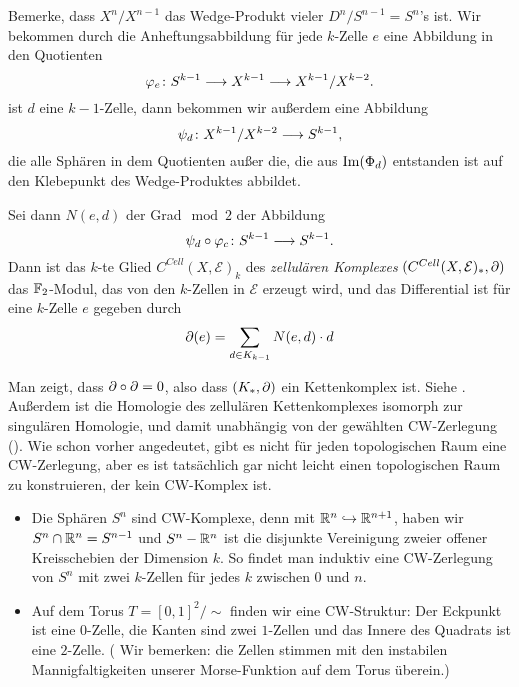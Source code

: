 \begin{definition}
    \label{def: zellulaerer kettenkomplex}
    Bemerke, dass $X^n / X^{n - 1}$ das Wedge-Produkt vieler $D^n / S^{n-1} = S^n$'s ist. 
    Wir bekommen durch die Anheftungsabbildung für jede $k$-Zelle $e$ eine Abbildung in den 
    Quotienten
    \[ \varphi_e \colon S^{k-1} \longrightarrow X^{k - 1} \longrightarrow X^{k - 1} / X^{k - 2} . \]
    ist $d$ eine $k - 1$-Zelle, dann bekommen wir außerdem eine Abbildung 
    \[ \psi_d \colon X^{k - 1} / X^{k - 2} \longrightarrow S^{k - 1} , \]
    die alle Sphären in dem Quotienten außer die, die aus ${ \operatorname{Im} } (\Phi_d)$ entstanden ist
    auf den Klebepunkt des Wedge-Produktes abbildet.

    Sei dann $N(e, d)$ der Grad$\mod 2$ der Abbildung
    \[ \psi_d \circ \varphi_c \colon S^{k - 1} \longrightarrow S^{k - 1} . \]
    Dann ist das $k$-te Glied $C^{Cell}(X, \mathcal{E})_k$ des \textit{zellulären Komplexes} 
    $(C^{Cell}(X, \mathcal{E})_{\ast}, { \partial })$ das 
    ${ \mathbb F }_2$-Modul, das von den $k$-Zellen in $\mathcal{E}$ erzeugt wird, und das Differential ist für 
    eine $k$-Zelle $e$ gegeben durch
    \[ { \partial } (e) = \sum_{d \in K_{k  - 1}} N(e, d) \cdot d \] 
\end{definition}

\begin{remark}
    Man zeigt, dass ${ \partial } \circ { \partial } = 0$, also dass $(K_{\ast}, { \partial })$ ein Kettenkomplex ist. 
    Siehe \cite{dold}. Außerdem ist die Homologie des zellulären Kettenkomplexes isomorph zur 
    singulären Homologie, und damit unabhängig von der gewählten CW-Zerlegung (\cite{hatcher}). 
    Wie schon vorher angedeutet, gibt es nicht für jeden topologischen Raum eine CW-Zerlegung,
    aber es ist tatsächlich gar nicht leicht einen topologischen Raum zu konstruieren, der 
    kein CW-Komplex ist.
\end{remark}

\begin{example}
    \begin{itemize}
        \item Die Sphären $S^n$ sind CW-Komplexe, denn mit ${ \mathbb R }^n \hookrightarrow { \mathbb R }^{n + 1}$,
            haben wir $S^n \cap { \mathbb R }^n = S^{n - 1}$ und $S^n - { \mathbb R }^n$ ist die disjunkte Vereinigung
            zweier offener Kreisschebien der Dimension $k$. So findet man induktiv eine CW-Zerlegung
            von $S^n$ mit zwei $k$-Zellen für jedes $k$ zwischen $0$ und $n$.
        \item Auf dem Torus $T = [0, 1]^2 / \sim$ finden wir eine CW-Struktur:
            Der Eckpunkt ist eine $0$-Zelle, die Kanten sind zwei $1$-Zellen und das Innere des 
            Quadrats ist eine $2$-Zelle.
            ( Wir bemerken: die Zellen stimmen mit den instabilen Mannigfaltigkeiten unserer 
             Morse-Funktion auf dem Torus überein.)
    \end{itemize}
\end{example}

